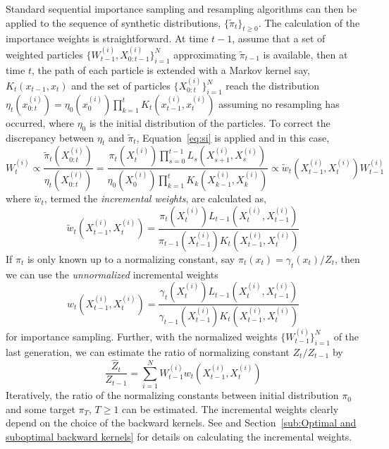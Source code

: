 Standard sequential importance sampling and resampling algorithms can then be applied to the sequence of synthetic distributions, $\{\tilde\pi_t\}_{t\ge0}$. The calculation of the importance weights is straightforward. At time $t-1$, assume that a set of weighted particles $\{W_{t-1}^{(i)},X_{0:t-1}^{(i)}\}_{i=1}^N$ approximating $\tilde\pi_{t-1}$ is available, then at time $t$, the path of each particle is extended with a Markov kernel say, $K_t(x_{t-1}, x_t)$ and the set of particles $\{X_{0:t}^{(i)}\}_{i=1}^N$ reach the distribution $\eta_t(x_{0:t}^{(i)}) = \eta_0(x_0^{(i)})\prod_{k=1}^tK_t(x_{t-1}^{(i)}, x_t^{(i)})$ assuming no resampling has occurred, where $\eta_0$ is the initial distribution of the particles. To correct the discrepancy between $\eta_t$ and $\tilde\pi_t$, Equation~\eqref{eq:si} is applied and in this case,
\begin{equation}
  W_t^{(i)} \propto \frac{\tilde\pi_t(X_{0:t}^{(i)})}{\eta_t(X_{0:t}^{(i)})}
  = \frac{\pi_t(X_t^{(i)})\prod_{s=0}^{t-1}L_s(X_{s+1}^{(i)}, X_s^{(i)})}
  {\eta_0(X_0^{(i)})\prod_{k=1}^tK_k(X_{k-1}^{(i)},X_k^{(i)})}
  \propto \tilde{w}_t(X_{t-1}^{(i)}, X_t^{(i)})W_{t-1}^{(i)}
\end{equation}
where $\tilde{w}_t$, termed the \emph{incremental weights}, are calculated as,
\begin{equation}
  \tilde{w}_t(X_{t-1}^{(i)},X_t^{(i)}) =
  \frac{\pi_t(X_t^{(i)})L_{t-1}(X_t^{(i)}, X_{t-1}^{(i)})}
  {\pi_{t-1}(X_{t-1}^{(i)})K_t(X_{t-1}^{(i)}, X_t^{(i)})}
\end{equation}
If $\pi_t$ is only known up to a normalizing constant, say $\pi_t(x_t) = \gamma_t(x_t)/Z_t$, then we can use the \emph{unnormalized} incremental weights
\begin{equation}
  w_t(X_{t-1}^{(i)},X_t^{(i)}) =
  \frac{\gamma_t(X_t^{(i)})L_{t-1}(X_t^{(i)}, X_{t-1}^{(i)})}
  {\gamma_{t-1}(X_{t-1}^{(i)})K_t(X_{t-1}^{(i)}, X_t^{(i)})}
\end{equation}
for importance sampling. Further, with the normalized weights $\{W_{t-1}^{(i)}\}_{i=1}^N$ of the last generation, we can estimate the ratio of normalizing constant $Z_t/Z_{t-1}$ by
\begin{equation}
  \frac{\hat{Z}_t}{Z_{t-1}} =
  \sum_{i=1}^N W_{t-1}^{(i)}w_t(X_{t-1}^{(i)},X_t^{(i)})
  \label{eq:ratio normalized}
\end{equation}
Iteratively, the ratio of the normalizing constants between initial distribution $\pi_0$ and some target $\pi_T$, $T\ge1$ can be estimated. The incremental weights clearly depend on the choice of the backward kernels. See \cite{DelMoral:2006hc} and Section~\ref{sub:Optimal and suboptimal backward kernels} for details on calculating the incremental weights.

